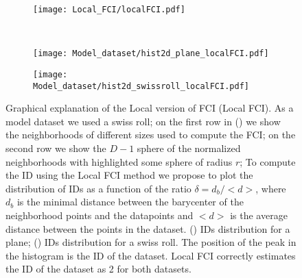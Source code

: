 \documentclass[11pt,a4paper]{article}
\begin{document}
\begin{figure}
 \centering
 \begin{subfigure}[b]{\textwidth}
   \centering
   \texttt{[image: Local\_FCI/localFCI.pdf]}
   \subcaption{}\label{fig:Local_FCI:localFCI}
 \end{subfigure}\\
 \begin{subfigure}[b]{0.45\textwidth}
   \centering
   \texttt{[image: Model\_dataset/hist2d\_plane\_localFCI.pdf]}
   \subcaption{}\label{fig:Local_FCI:2dhist_plane}
 \end{subfigure}
 \begin{subfigure}[b]{0.45\textwidth}
   \centering
   \texttt{[image: Model\_dataset/hist2d\_swissroll\_localFCI.pdf]}
   \subcaption{}\label{fig:Local_FCI:2dhist_swissroll}
 \end{subfigure}
 \caption{Graphical explanation of the Local version of FCI (Local FCI). As a model dataset we used a swiss roll;
 on the first row in () we show the neighborhoods of different sizes used to compute the FCI;
 on the second row we show the $D-1$ sphere of the normalized neighborhoods with highlighted some sphere of radius $r$;
 To compute the ID using the Local FCI method we propose to plot the distribution of IDs as a function of the ratio $\delta =d_b/<d>$,
 where $d_b$ is the minimal distance between the barycenter of the neighborhood points and the datapoints and $<d>$ is the average distance between the points in the dataset.
 () IDs distribution for a plane; () IDs distribution for a swiss roll.
The position of the peak in the histogram is the ID of the dataset. Local FCI correctly estimates the ID of the dataset as 2 for both datasets.}\label{fig:Local_FCI}
\end{figure}
\end{document}
